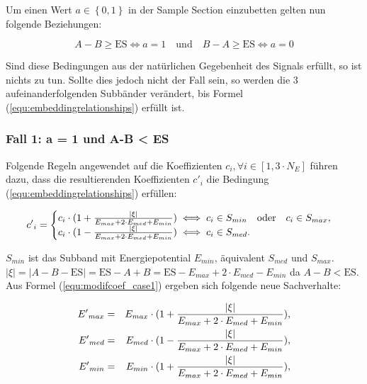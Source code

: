 Um einen Wert $a \in\left\{0,1\right\}$ in der Sample Section einzubetten gelten nun folgende Beziehungen:

	 \begin{equation}
		 A - B \geq \mbox{ES} \iff a = 1 \quad\mbox{und}\quad B - A \geq \mbox{ES} \iff a = 0 \label{equ:embeddingrelationships}
	 \end{equation}
	 
Sind diese Bedingungen aus der natürlichen Gegebenheit des Signals erfüllt, so ist nichts zu tun. Sollte dies jedoch nicht der Fall sein, so werden die 3 aufeinanderfolgenden Subbänder verändert, bis Formel (\ref{equ:embeddingrelationships}) erfüllt ist. 

\subsubsection{Fall 1: a = 1 und A-B < ES} 

Folgende Regeln angewendet auf die Koeffizienten ${c}_{i}, \forall i \in [1, 3\cdot{N}_{E}]$ führen dazu, dass die resultierenden Koeffizienten ${c'}_{i}$ die Bedingung (\ref{equ:embeddingrelationships}) erfüllen:

	 \begin{equation}
		 {c'}_{i} = \begin{cases}
    	 				{c}_{i} \cdot ( 1 + { |\xi| \over {{E}_{max} + 2\cdot {E}_{med} + {E}_{min}} }) \iff {c}_{i} \in {S}_{min} \quad\mbox{oder}\quad {c}_{i} \in {S}_{max}, 
						\\
    					{c}_{i} \cdot ( 1 - { |\xi| \over {{E}_{max} + 2\cdot {E}_{med} + {E}_{min}} }) \iff {c}_{i} \in {S}_{med}.
  				  	\end{cases}
		  \label{equ:modifcoef_case1}
	 \end{equation}
	 
${S}_{min}$ ist das Subband mit Energiepotential ${E}_{min}$, äquivalent ${S}_{med}$ und ${S}_{max}$. $|\xi| = |A-B-\mbox{ES}| = \mbox{ES}-A+B = \mbox{ES} - {E}_{max} + 2\cdot {E}_{med} - {E}_{min}$ da $A-B<\mbox{ES}$. Aus Formel (\ref{equ:modifcoef_case1}) ergeben sich folgende neue Sachverhalte:
	 
	 \begin{eqnarray*}
		 {E'}_{max} & = & {E}_{max} \cdot (1 + { |\xi| \over {{E}_{max} + 2\cdot {E}_{med} + {E}_{min}} }),
		 \\ 
		 {E'}_{med} & = & {E}_{med} \cdot (1 - { |\xi| \over {{E}_{max} + 2\cdot {E}_{med} + {E}_{min}} }),
		 \\
		 {E'}_{min} & = & {E}_{min} \cdot (1 + { |\xi| \over {{E}_{max} + 2\cdot {E}_{med} + {E}_{min}} }),
	\end{eqnarray*}	 
	 
